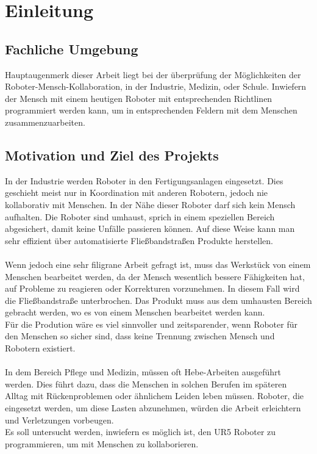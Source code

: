 \chapter{Einleitung}
\label{einleitung}

\section{Fachliche Umgebung}
\label{fachliche_domaene}

Hauptaugenmerk dieser Arbeit liegt bei der überprüfung der Möglichkeiten der Roboter-Mensch-Kollaboration,
in der Industrie, Medizin, oder Schule.
Inwiefern der Mensch mit einem heutigen Roboter mit entsprechenden Richtlinen programmiert werden kann, um in entsprechenden Feldern mit dem Menschen zusammenzuarbeiten.

\section{Motivation und Ziel des Projekts}
\label{projektziel_motivation}

In der Industrie werden Roboter in den Fertigungsanlagen eingesetzt. 
Dies geschieht meist nur in Koordination mit anderen Robotern, jedoch nie kollaborativ mit Menschen. In der Nähe dieser Roboter darf sich kein Mensch aufhalten. Die Roboter sind umhaust, sprich in einem speziellen Bereich abgesichert, damit keine Unfälle passieren können. 
Auf diese Weise kann man sehr effizient über automatisierte Fließbandstraßen Produkte herstellen.
\\\\
Wenn jedoch eine sehr filigrane Arbeit gefragt ist, muss das Werkstück von einem Menschen bearbeitet werden, da der Mensch wesentlich bessere Fähigkeiten hat, auf Probleme zu reagieren oder Korrekturen vorzunehmen. In diesem Fall wird die Fließbandstraße unterbrochen. Das Produkt muss aus dem umhausten Bereich gebracht werden, wo es von einem Menschen bearbeitet werden kann.
\\
Für die Prodution wäre es viel sinnvoller und zeitsparender, wenn Roboter für den Menschen so sicher sind, dass keine Trennung zwischen Mensch und Robotern existiert.
\\\\
In dem Bereich Pflege und Medizin, müssen oft Hebe-Arbeiten ausgeführt werden. Dies führt dazu, dass die Menschen in solchen Berufen im späteren Alltag mit Rückenproblemen oder ähnlichem Leiden leben müssen. Roboter, die eingesetzt werden, um diese Lasten abzunehmen, würden die Arbeit erleichtern und Verletzungen vorbeugen.
\\
Es soll untersucht werden, inwiefern es möglich ist, den UR5 Roboter zu programmieren, um mit Menschen zu kollaborieren.

